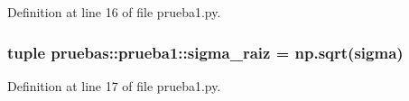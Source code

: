 \-Definition at line 16 of file prueba1.\-py.

\subsubsection[{sigma\-\_\-raiz}]{\setlength{\rightskip}{0pt plus 5cm}tuple {\bf pruebas\-::prueba1\-::sigma\-\_\-raiz} = np.\-sqrt({\bf sigma})}\label{namespacepruebas_1_1prueba1_a6ae3c3a50029dc7cdc387aab2a262b2c}


\-Definition at line 17 of file prueba1.\-py.

